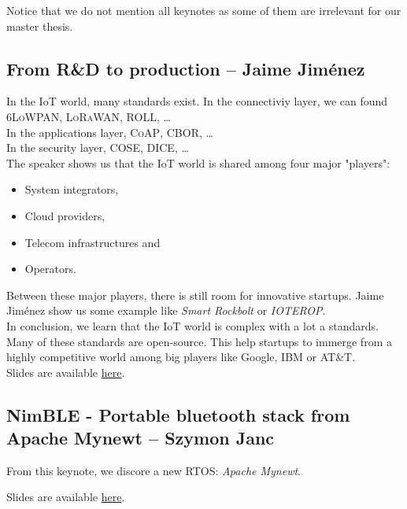 \documentclass[journal, a4paper]{../IEEEtran}
\begin{document}
Notice that we do not mention all keynotes as some of them are irrelevant for our master thesis.

\subsection{From R\&D to production -- Jaime Jiménez}
In the IoT world, many standards exist. In the connectiviy layer, we can found \textsc{6LoWPAN}, \textsc{LoRaWAN}, \textsc{ROLL}, \dots \\
In the applications layer, \textsc{CoAP}, \textsc{CBOR}, \dots \\ 
In the security layer, \textsc{COSE}, \textsc{DICE}, \dots \\

The speaker shows us that the IoT world is shared among four major "players":
\begin{itemize}
    \item System integrators,
    \item Cloud providers,
    \item Telecom infrastructures and
    \item Operators.
\end{itemize}

Between these major players, there is still room for innovative startups. Jaime Jiménez show us some example like \textit{Smart Rockbolt} or \textit{IOTEROP}. \\

In conclusion, we learn that the IoT world is complex with a lot a standards. 
Many of these standards are open-source.
This help startups to immerge from a highly competitive world among big players like Google, IBM or AT\&T. \\

Slides are available \href{http://summit.riot-os.org/2018/wp-content/uploads/sites/10/2018/09/0_3-Jaime-Jimenez-Keynote.pdf}{here}.

\subsection{NimBLE - Portable bluetooth stack from Apache Mynewt -- Szymon Janc}
From this keynote, we discore a new RTOS: \textit{Apache Mynewt}.


Slides are available \href{http://summit.riot-os.org/2018/wp-content/uploads/sites/10/2018/09/1_1-Szymon-Janc-NimBLE.pdf}{here}.
\end{document}
